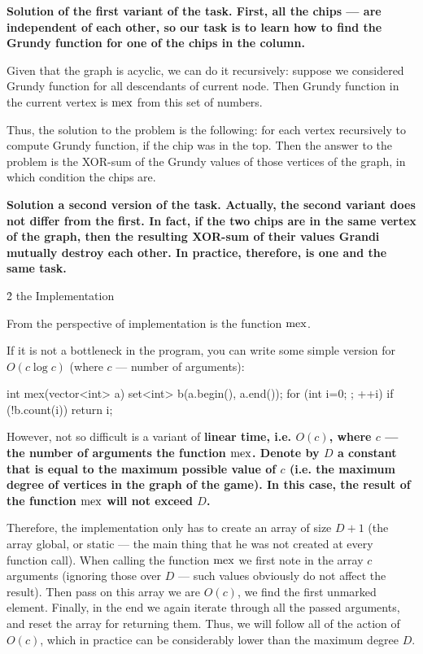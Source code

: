 \bf{Solution of the first variant of the task}. First, all the chips --- are independent of each other, so our task is to learn how to find the Grundy function for one of the chips in the column.

Given that the graph is acyclic, we can do it recursively: suppose we considered Grundy function for all descendants of current node. Then Grundy function in the current vertex is $\rm mex$ from this set of numbers.

Thus, the solution to the problem is the following: for each vertex recursively to compute Grundy function, if the chip was in the top. Then the answer to the problem is the XOR-sum of the Grundy values of those vertices of the graph, in which condition the chips are.

\bf{Solution a second version of the task}. Actually, the second variant does not differ from the first. In fact, if the two chips are in the same vertex of the graph, then the resulting XOR-sum of their values Grandi mutually destroy each other. In practice, therefore, is one and the same task.


\h2{ the Implementation }

From the perspective of implementation is the function $\rm mex$.

If it is not a bottleneck in the program, you can write some simple version for $O (c \log c)$ (where $c$ --- number of arguments):

\code
int mex(vector<int> a) {
set<int> b(a.begin(), a.end());
for (int i=0; ; ++i)
if (!b.count(i))
return i;
}
\endcode

However, not so difficult is a variant of \bf{linear time}, i.e. $O (c)$, where $c$ --- the number of arguments the function $\rm mex$. Denote by $D$ a constant that is equal to the maximum possible value of $c$ (i.e. the maximum degree of vertices in the graph of the game). In this case, the result of the function $\rm mex$ will not exceed $D$.

Therefore, the implementation only has to create an array of size $D+1$ (the array global, or static --- the main thing that he was not created at every function call). When calling the function $\rm mex$ we first note in the array $c$ arguments (ignoring those over $D$ --- such values obviously do not affect the result). Then pass on this array we are $O (c)$, we find the first unmarked element. Finally, in the end we again iterate through all the passed arguments, and reset the array for returning them. Thus, we will follow all of the action of $O (c)$, which in practice can be considerably lower than the maximum degree $D$.

